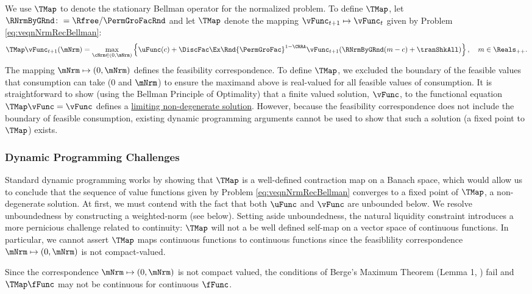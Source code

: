 \documentclass[\econtexRoot/BufferStockTheory]{subfiles}
\begin{document}
We use $\TMap$ to denote the stationary Bellman operator for the normalized problem.
To define $\TMap$, let $\RNrmByGRnd \colon = \Rfree/\PermGroFacRnd$ and let $\TMap$ denote the mapping $\vFunc_{t+1} \mapsto \vFunc_{t}$ given by Problem \ref{eq:veqnNrmRecBellman}:
%
\begin{equation}\label{eq:maintmap}
  \TMap \vFunc_{t+1}(\mNrm) = \max_{\cNrm \in (0, \mNrm) }  \left\{
    \uFunc(c) + \DiscFac\Ex\Rnd{\PermGroFac}^{1-\CRRA}\vFunc_{t+1}(\RNrmByGRnd(m - c) + \tranShkAll)
  \right\}, \quad m \in \Reals_{++}.  
\end{equation}
%
The mapping $\mNrm\mapsto (0, \mNrm)$ defines the feasibility correspondence.
To define $\TMap$, we excluded the boundary of the feasible values that consumption can take ($0$ and $\mNrm$) to ensure the maximand above is real-valued for all feasible values of consumption.
It is straightforward to show (using the Bellman Principle of Optimality) that a finite valued solution, $\vFunc$, to the functional equation $\TMap\vFunc = \vFunc$ defines a \hyperlink{sensible}{limiting non-degenerate solution}.
However, because the feasibility correspondence does not include the boundary of feasible consumption, existing dynamic programming arguments cannot be used to show that such a solution (a fixed point to $\TMap$) exists.


\subsubsection{Dynamic Programming Challenges}\label{subsubsec:challengesDP} \hypertarget{challengesDP}{} Standard dynamic programming \citep{stachurski2022} works by showing that $\TMap$ is a well-defined contraction map on a Banach space, which would allow us to conclude that the sequence of value functions given by Problem \ref{eq:veqnNrmRecBellman} converges to a fixed point of $\TMap$, a non-degenerate solution.
At first, we must contend with the fact that both $\uFunc$ and $\vFunc$ are unbounded below.
We resolve unboundedness by constructing a weighted-norm (see below).
Setting aside unboundedness, the natural liquidity constraint introduces a more pernicious challenge related to continuity: $\TMap$ will not a be well defined self-map on a vector space of continuous functions.
In particular, we cannot assert $\TMap$ maps continuous functions to continuous functions since the feasiblility correspondence $\mNrm\mapsto (0, \mNrm)$ is not compact-valued.

\begin{remark}\label{remark:notCompact}
Since the correspondence $\mNrm\mapsto (0, \mNrm)$ is not compact valued, the conditions of Berge's Maximum Theorem (Lemma 1, \cite{Jaskiewicz2011}) fail and $\TMap \fFunc$ may not be continuous for continuous $\fFunc$.
\end{remark}
\end{document}
